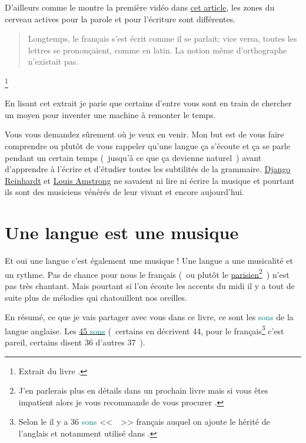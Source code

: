 D'ailleurs comme le montre la première vidéo dans \href{http://doyouspeakenglish.fr/prescriptiviste-ou-descriptiviste/}{cet article}, les zones du cerveau actives
pour la parole et pour l'écriture sont différentes.\par

\begin{quote}
Longtemps, le français s'est écrit comme il se parlait; vice versa,
toutes les lettres se prononçaient, comme en latin. La notion même
d'orthographe n'existait pas.
\end{quote}\footnote{Extrait du livre \FL.}


En lisant cet extrait je parie que certains d'entre vous sont en train
de chercher un moyen pour inventer une machine à remonter le temps. 

Vous vous demandez sûrement où je veux en venir. Mon but est de vous
faire comprendre ou plutôt de vous rappeler qu'une langue ça s'écoute
et ça se parle pendant un certain temps (~jusqu'à ce que ça devienne
naturel~) avant d'apprendre à l'écrire et d'étudier toutes les
subtilités de la grammaire. \href{https://fr.wikipedia.org/wiki/Django\_Reinhardt}{Django Reinhardt} et \href{https://fr.wikipedia.org/wiki/Louis\_Armstrong}{Louis Amstrong} ne
savaient ni lire ni écrire la musique et pourtant ils sont des
musiciens vénérés de leur vivant et encore aujourd'hui.\par

\section{Une langue est une musique}\label{sec:music}
Et oui une langue c'est également une musique ! Une langue a une
musicalité et un rythme. Pas de chance pour nous le français (~ou
plutôt le \underline{parisien}\footnote{J'en parlerais plus en détails
  dans un prochain livre mais si vous êtes impatient alors je vous
  recommande de vous procurer \FL.}~)
n'est pas très chantant. Mais pourtant si l'on écoute les accents du
midi il y a tout de suite plus de mélodies qui chatouillent nos
oreilles. 

En résumé, ce que je vais partager avec vous dans ce livre, ce
sont les \textcolor{teal}{sons} de la langue anglaise. Les \href{https://pronunciationstudio.com/45-Sounds/}{45 \textcolor{teal}{sons}} (~certains en
décrivent 44, pour le français\footnote{Selon le \GE il y a 36 \textcolor{teal}{sons}
  <<~~>> français auquel on ajoute le 
  hérité de l'anglais et notamment utilisé dans .} c'est
pareil, certains disent 36 d'autres 37~).\par

